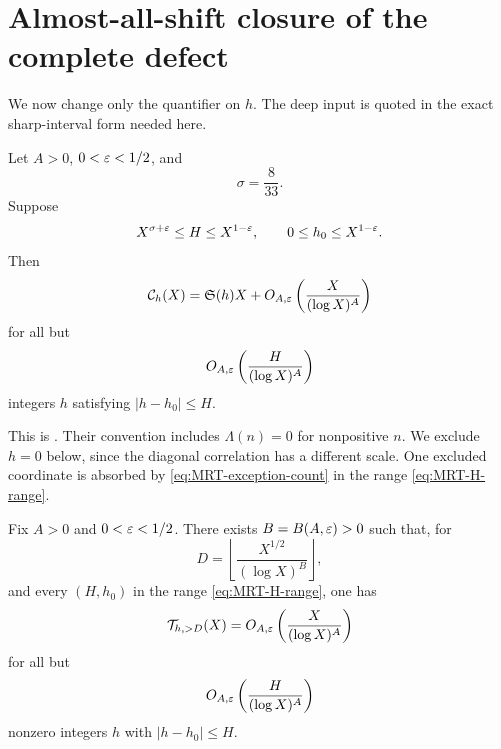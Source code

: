 \section{Almost-all-shift closure of the complete defect}
\label{sec:almost-all-closure}

We now change only the quantifier on $h$.  The deep input is quoted in the
exact sharp-interval form needed here.

\begin{theorem}
\label{thm:MRT-averaged-HL}
Let $A>0$, $0<\varepsilon<1/2$, and
\begin{equation}\label{eq:sigma-eight-thirty-three}
 \sigma=\frac8{33}.
\end{equation}
Suppose
\begin{equation}\label{eq:MRT-H-range}
 X^{\sigma+\varepsilon}\le H\le X^{1-\varepsilon},
 \qquad
 0\le h_0\le X^{1-\varepsilon}.
\end{equation}
Then
\begin{equation}\label{eq:MRT-pair-asymptotic}
 \mathcal C_h(X)=\mathfrak S(h)X
 +O_{A,\varepsilon}\left(\frac{X}{(\log X)^A}\right)
\end{equation}
for all but
\begin{equation}\label{eq:MRT-exception-count}
 O_{A,\varepsilon}\left(\frac{H}{(\log X)^A}\right)
\end{equation}
integers $h$ satisfying $|h-h_0|\le H$.
\end{theorem}

This is \citet[Theorem~1.3(i)]{MatomakiRadziwillTao2019}.  Their convention
includes $\Lambda(n)=0$ for nonpositive $n$.  We exclude $h=0$ below, since
the diagonal correlation has a different scale.  One excluded coordinate is
absorbed by \eqref{eq:MRT-exception-count} in the range
\eqref{eq:MRT-H-range}.

\begin{theorem}
\label{thm:complete-defect-almost-all}
Fix $A>0$ and $0<\varepsilon<1/2$.  There exists
$B=B(A,\varepsilon)>0$ such that, for
\begin{equation}\label{eq:closure-D}
 D=\left\lfloor\frac{X^{1/2}}{(\log X)^B}\right\rfloor,
\end{equation}
and every $(H,h_0)$ in the range \eqref{eq:MRT-H-range}, one has
\begin{equation}\label{eq:complete-defect-small}
 \mathcal T_{h,>D}(X)
 =O_{A,\varepsilon}\left(\frac{X}{(\log X)^A}\right)
\end{equation}
for all but
\begin{equation}\label{eq:complete-defect-exceptions}
 O_{A,\varepsilon}\left(\frac{H}{(\log X)^A}\right)
\end{equation}
nonzero integers $h$ with $|h-h_0|\le H$.
\end{theorem}

